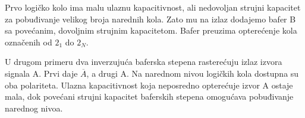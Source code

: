 Prvo logičko kolo ima malu ulaznu kapacitivnost, ali nedovoljan strujni kapacitet za pobuđivanje velikog broja narednih kola. Zato mu na izlaz dodajemo bafer B sa povećanim, dovoljnim strujnim kapacitetom. Bafer preuzima opterećenje kola označenih od $2_1$ do $2_N$.

U drugom primeru dva inverzujuća baferska stepena rasterećuju izlaz izvora signala A. Prvi daje $\overline A$, a drugi A. Na narednom nivou logičkih kola dostupna su oba polariteta. Ulazna kapacitivnost koja neposredno opterećuje izvor A ostaje mala, dok povećani strujni kapacitet baferskih stepena omogućava pobuđivanje narednog nivoa.
